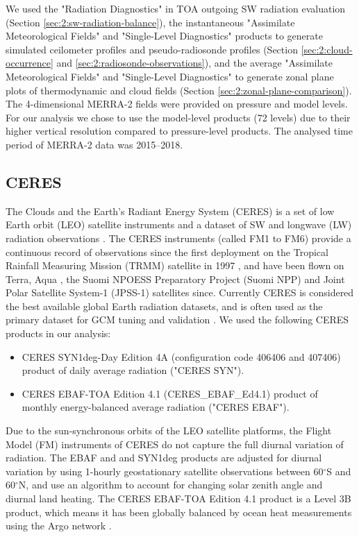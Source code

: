 We used the "Radiation Diagnostics" in TOA outgoing SW radiation evaluation (Section
\ref{sec:2:sw-radiation-balance}), the instantaneous "Assimilate Meteorological
Fields" and "Single-Level Diagnostics" products to generate simulated
ceilometer profiles and pseudo-radiosonde profiles (Section
\ref{sec:2:cloud-occurrence} and \ref{sec:2:radiosonde-observations}), and the
average "Assimilate Meteorological Fields" and "Single-Level Diagnostics" to
generate zonal plane plots of thermodynamic and cloud fields (Section
\ref{sec:2:zonal-plane-comparison}). The 4-dimensional MERRA-2 fields were
provided on pressure and model levels. For our analysis we chose to use the
model-level products (72 levels) due to their higher vertical resolution
compared to pressure-level products. The analysed time period of MERRA-2 data
was 2015--2018.

\subsection{CERES}

The Clouds and the Earth's Radiant Energy System (CERES) is a set of low Earth
orbit (LEO) satellite instruments and a dataset of SW and longwave (LW)
radiation observations \citep{loeb2018,doelling2016}. The CERES instruments
(called FM1 to FM6) provide a continuous record of observations since the first
deployment on the Tropical Rainfall Measuring Mission (TRMM) satellite in 1997
\citep{simpson1996}, and have been flown on Terra, Aqua \citep{parkinson2003},
the Suomi NPOESS Preparatory Project (Suomi NPP) and Joint Polar Satellite
System-1 (JPSS-1) \citep{goldberg2013} satellites since. Currently CERES is
considered the best available global Earth radiation datasets, and is often used
as the primary dataset for GCM tuning and validation
\citep{schmidt2017,hourdin2017}. We used the following CERES products in our
analysis:

\begin{itemize}
\item CERES SYN1deg-Day Edition 4A (configuration code 406406 and 407406)
product of daily average radiation ("CERES SYN").
\item CERES EBAF-TOA Edition 4.1 (CERES\_EBAF\_Ed4.1)
product of monthly energy-balanced average radiation ("CERES EBAF").
\end{itemize}

Due to the sun-synchronous orbits of the LEO satellite platforms, the Flight
Model (FM) instruments of CERES do not capture the full diurnal variation of
radiation. The EBAF and and SYN1deg products are adjusted for diurnal variation
by using 1-hourly geostationary satellite observations between 60$^\circ$S and
60$^\circ$N, and use an algorithm to account for changing solar zenith angle and
diurnal land heating. The CERES EBAF-TOA Edition 4.1 product is a Level 3B
product, which means it has been globally balanced by ocean heat measurements
using the Argo network \citep{roemmich2009a,roemmich2009b}.

